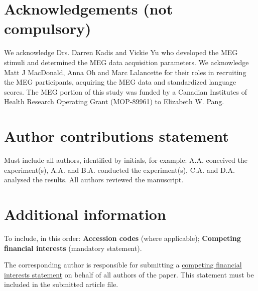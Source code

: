 \documentclass[fleqn,10pt]{wlscirep}
\begin{document}
\section*{Acknowledgements (not compulsory)}

We acknowledge Drs. Darren Kadis and Vickie Yu who developed the MEG stimuli and determined the MEG data acquisition parameters. We acknowledge Matt J MacDonald, Anna Oh and Marc Lalancette for their roles in recruiting the MEG participants, acquiring the MEG data and standardized language scores. The MEG portion of this study was funded by a Canadian Institutes of Health Research Operating Grant (MOP-89961) to Elizabeth W. Pang.

\section*{Author contributions statement}

Must include all authors, identified by initials, for example:
A.A. conceived the experiment(s),  A.A. and B.A. conducted the experiment(s), C.A. and D.A. analysed the results.  All authors reviewed the manuscript. 

\section*{Additional information}

To include, in this order: \textbf{Accession codes} (where applicable); \textbf{Competing financial interests} (mandatory statement). 

The corresponding author is responsible for submitting a \href{http://www.nature.com/srep/policies/index.html#competing}{competing financial interests statement} on behalf of all authors of the paper. This statement must be included in the submitted article file.
\end{document}
